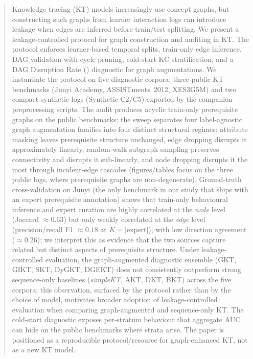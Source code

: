 \maketitle
\begin{abstract}
Knowledge tracing (KT) models increasingly use concept graphs, but
constructing such graphs from learner interaction logs can introduce
leakage when edges are inferred before train/test splitting. We present
a leakage-controlled protocol for \KC{} graph construction and auditing
in KT. The protocol enforces learner-based temporal splits, train-only
edge inference, DAG validation with cycle pruning, cold-start KC
stratification, and a DAG Disruption Rate (\DDR{}) diagnostic for graph
augmentations. We instantiate the protocol on five diagnostic corpora:
three public KT benchmarks (Junyi Academy, ASSISTments~2012, XES3G5M)
and two compact synthetic logs (Synthetic C2/C5) exported by the
companion preprocessing scripts. The audit produces acyclic train-only
prerequisite graphs on the public benchmarks; the \DDR{} sweep separates four
label-agnostic graph augmentation families into four distinct
structural regimes: attribute masking leaves prerequisite structure
unchanged, edge dropping disrupts it approximately linearly,
random-walk subgraph sampling preserves connectivity and disrupts it
sub-linearly, and node dropping disrupts it the most through
incident-edge cascades (figures/tables focus on the three public logs,
where prerequisite graphs are non-degenerate). Ground-truth cross-validation on Junyi (the
only benchmark in our study that ships with an expert prerequisite
annotation) shows that train-only behavioural inference and expert
curation are highly correlated at the \emph{node} level (Jaccard
${\approx}0.63$) but only weakly correlated at the \emph{edge} level
(precision/recall F1 ${\approx}0.18$ at $K\!=\!|\text{expert}|$), with
low direction agreement (${\approx}0.26$); we interpret this as
evidence that the two sources capture related but distinct aspects of
prerequisite structure. Under leakage-controlled evaluation, the
graph-augmented diagnostic ensemble (GKT, GIKT, SKT, DyGKT, DGEKT)
does not consistently outperform strong sequence-only baselines
(\textit{simpleKT}, AKT, DKT, BKT) across the five corpora; this observation, surfaced by the protocol rather than by
the choice of model, motivates broader adoption of leakage-controlled
evaluation when comparing graph-augmented and sequence-only KT. The
cold-start diagnostic exposes per-stratum behaviour that aggregate AUC
can hide on the public benchmarks where strata arise. The paper is positioned as a reproducible protocol/resource
for graph-enhanced KT, not as a new KT model.
\end{abstract}

